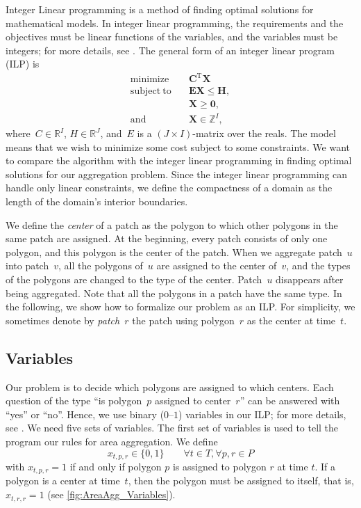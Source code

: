 Integer Linear programming is a method 
of finding optimal solutions for mathematical models.
In integer linear programming, 
the requirements and the objectives must be 
linear functions of the variables, 
and the variables must be integers; 
for more details, see 
\textcite[chapter~13]{Papadimitriou1982combinatorial}.
The general form of an integer linear program (ILP) is
\begin{align*} 
\mathrm{minimize} 	\quad	 & \bm{C}^\mathrm{T}\bm{X}  \\
\mathrm{subject~to} \quad	 & \bm{EX \le H}, \\
							 & \bm{X}\ge \bm{0}, \\
\mathrm{and} 		\quad	 & \bm{X} \in \mathbb{Z}^I,
\end{align*}
where~$C \in \mathbb{R}^I$, $H \in \mathbb{R}^J$,
and~$E$ is a $(J \times I)$-matrix over the reals.
The model means that 
we wish to minimize some cost subject to some constraints.
We want to compare the \Astar algorithm with 
the integer linear programming in finding 
optimal solutions for our aggregation problem. 
Since the integer linear programming
can handle only linear constraints, 
we define the compactness of a domain as 
the length of the domain's interior boundaries.

We define the \emph{center} of a patch as the polygon 
to which other polygons in the same patch are assigned. 
At the beginning, every patch consists of only one polygon, 
and this polygon is the center of the patch.
When we aggregate patch~$u$ into patch~$v$, 
all the polygons of~$u$ are assigned to the center of~$v$,
and the types of the polygons are changed to the type of the 
center.
Patch~$u$ disappears after being aggregated.
Note that all the polygons in a patch have the same type.
In the following, we show how to formalize our problem 
as an ILP.
For simplicity, we sometimes denote by \emph{patch~$r$} the 
patch using polygon~$r$ as the center at time~$t$.


\subsection{Variables}
\label{sub:variables}

Our problem is to decide 
which polygons are assigned to which centers.
Each question of the type 
``is polygon~$p$ assigned to center~$r$''
can be answered with ``yes'' or ``no''.
Hence, we use binary ($0$--$1$) variables in our ILP;
for more details, see \textcite[chapter~9]{bradley1977applied}.
We need five sets of variables.
%
The first set of variables is used to tell the program 
our rules for area aggregation.
We define 
$$
x_{t,p,r}\in \{0,1\} \qquad 
\forall t\in T, \forall p,r \in P 
$$
with $x_{t,p,r}=1$ if and only if 
polygon $p$ is assigned to polygon $r$ at time $t$. 
If a polygon is a center at time~$t$, 
then the polygon must be assigned to itself, 
that is, $x_{t,r,r}=1$
(see \fig\ref{fig:AreaAgg_Variables}).

